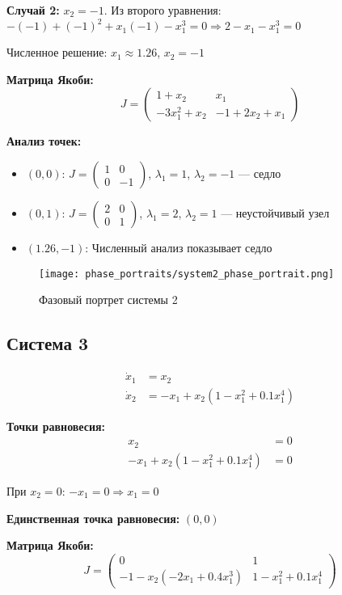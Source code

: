 \textbf{Случай 2:} $x_2 = -1$. Из второго уравнения: $-(-1) + (-1)^2 + x_1(-1) - x_1^3 = 0 \Rightarrow 2 - x_1 - x_1^3 = 0$

Численное решение: $x_1 \approx 1.26$, $x_2 = -1$

\textbf{Матрица Якоби:}
$$J = \begin{pmatrix} 1 + x_2 & x_1 \\ -3x_1^2 + x_2 & -1 + 2x_2 + x_1 \end{pmatrix}$$

\textbf{Анализ точек:}
\begin{itemize}
\item $(0, 0)$: $J = \begin{pmatrix} 1 & 0 \\ 0 & -1 \end{pmatrix}$, $\lambda_1 = 1$, $\lambda_2 = -1$ --- седло
\item $(0, 1)$: $J = \begin{pmatrix} 2 & 0 \\ 0 & 1 \end{pmatrix}$, $\lambda_1 = 2$, $\lambda_2 = 1$ --- неустойчивый узел
\item $(1.26, -1)$: Численный анализ показывает седло
\end{itemize}

\begin{figure}[H]
\centering
\texttt{[image: phase\_portraits/system2\_phase\_portrait.png]}
\caption{Фазовый портрет системы 2}
\label{fig:system2_phase_portrait}
\end{figure}

\subsection*{Система 3}

\begin{align}
\dot{x}_1 &= x_2 \\
\dot{x}_2 &= -x_1 + x_2(1 - x_1^2 + 0.1x_1^4)
\end{align}

\textbf{Точки равновесия:}
\begin{align}
x_2 &= 0 \\
-x_1 + x_2(1 - x_1^2 + 0.1x_1^4) &= 0
\end{align}

При $x_2 = 0$: $-x_1 = 0 \Rightarrow x_1 = 0$

\textbf{Единственная точка равновесия:} $(0, 0)$

\textbf{Матрица Якоби:}
$$J = \begin{pmatrix} 0 & 1 \\ -1 - x_2(-2x_1 + 0.4x_1^3) & 1 - x_1^2 + 0.1x_1^4 \end{pmatrix}$$

